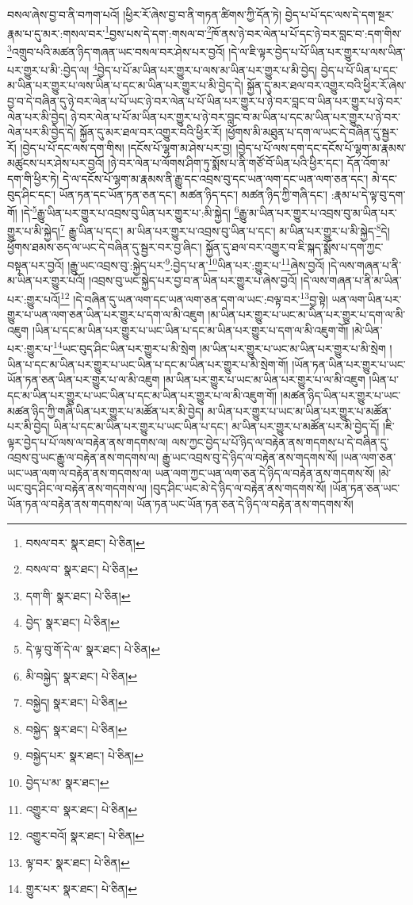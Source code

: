བསལ་ཞེས་བྱ་བ་ནི་བཀག་པའོ། །ཕྱིར་རོ་ཞེས་བྱ་བ་ནི་གཏན་ཚིགས་ཀྱི་དོན་ཏེ། བྱེད་པ་པོ་དང་ལས་དེ་དག་སྔར་རྣམ་པ་དུ་མར་:གསལ་བར་\footnote{བསལ་བར་  སྣར་ཐང་།  པེ་ཅིན། }བྱས་པས་དེ་དག་:གསལ་བ་\footnote{བསལ་བ་  སྣར་ཐང་།  པེ་ཅིན། }ཁོ་ནས་ཉེ་བར་ལེན་པ་པོ་དང་ཉེ་བར་བླང་བ་:དག་གིས་\footnote{དག་གི་  སྣར་ཐང་།  པེ་ཅིན། }འགྲུབ་པའི་མཚན་ཉིད་གཞན་ཡང་བསལ་བར་ཤེས་པར་བྱའོ། །དེ་ལ་ཇི་ལྟར་བྱེད་པ་པོ་ཡིན་པར་གྱུར་པ་ལས་ཡིན་པར་གྱུར་པ་མི་:བྱེད་ལ། \footnote{བྱེད་  སྣར་ཐང་།  པེ་ཅིན། }བྱེད་པ་པོ་མ་ཡིན་པར་གྱུར་པ་ལས་མ་ཡིན་པར་གྱུར་པ་མི་བྱེད། བྱེད་པ་པོ་ཡིན་པ་དང་མ་ཡིན་པར་གྱུར་པ་ལས་ཡིན་པ་དང་མ་ཡིན་པར་གྱུར་པ་མི་བྱེད་དེ། སྐྱོན་དུ་མར་ཐལ་བར་འགྱུར་བའི་ཕྱིར་རོ་ཞེས་བྱ་བ་དེ་བཞིན་དུ་ཉེ་བར་ལེན་པ་པོ་ཡང་ཉེ་བར་ལེན་པ་པོ་ཡིན་པར་གྱུར་པ་ཉེ་བར་བླང་བ་ཡིན་པར་གྱུར་པ་ཉེ་བར་ལེན་པར་མི་བྱེད། ཉེ་བར་ལེན་པ་པོ་མ་ཡིན་པར་གྱུར་པ་ཉེ་བར་བླང་བ་མ་ཡིན་པ་དང་མ་ཡིན་པར་གྱུར་པ་ཉེ་བར་ལེན་པར་མི་བྱེད་དེ། སྐྱོན་དུ་མར་ཐལ་བར་འགྱུར་བའི་ཕྱིར་རོ། །ཕྱོགས་མི་མཐུན་པ་དག་ལ་ཡང་དེ་བཞིན་དུ་སྦྱར་རོ། །བྱེད་པ་པོ་དང་ལས་དག་གིས། །དངོས་པོ་ལྷག་མ་ཤེས་པར་བྱ། །བྱེད་པ་པོ་ལས་དག་དང་དངོས་པོ་ལྷག་མ་རྣམས་མཚུངས་པར་ཤེས་པར་བྱའོ། །ཉེ་བར་ལེན་པ་ལོགས་ཤིག་ཏུ་སྨོས་པ་ནི་གཙོ་བོ་ཡིན་པའི་ཕྱིར་དང་། དོན་འོག་མ་དག་གི་ཕྱིར་ཏེ། དེ་ལ་དངོས་པོ་ལྷག་མ་རྣམས་ནི་རྒྱུ་དང་འབྲས་བུ་དང་ཡན་ལག་དང་ཡན་ལག་ཅན་དང་། མེ་དང་བུད་ཤིང་དང་། ཡོན་ཏན་དང་ཡོན་ཏན་ཅན་དང་། མཚན་ཉིད་དང་། མཚན་ཉིད་ཀྱི་གཞི་དང་། :རྣམ་པ་དེ་ལྟ་བུ་དག་གོ། །དེ་\footnote{དེ་ལྟ་བུ་གོ་དེ་ལ་  སྣར་ཐང་།  པེ་ཅིན། }རྒྱུ་ཡིན་པར་གྱུར་པ་འབྲས་བུ་ཡིན་པར་གྱུར་པ་:མི་སྐྱེད། \footnote{མི་བསྐྱེད་  སྣར་ཐང་།  པེ་ཅིན། }རྒྱུ་མ་ཡིན་པར་གྱུར་པ་འབྲས་བུ་མ་ཡིན་པར་གྱུར་པ་མི་སྐྱེད།\footnote{བསྐྱེད།  སྣར་ཐང་།  པེ་ཅིན། } རྒྱུ་ཡིན་པ་དང་། མ་ཡིན་པར་གྱུར་པ་འབྲས་བུ་ཡིན་པ་དང་། མ་ཡིན་པར་གྱུར་པ་མི་སྐྱེད་\footnote{བསྐྱེད་  སྣར་ཐང་།  པེ་ཅིན། }དེ། ཕྱོགས་ཐམས་ཅད་ལ་ཡང་དེ་བཞིན་དུ་སྦྱར་བར་བྱ་ཞིང་། སྐྱོན་དུ་ཐལ་བར་འགྱུར་བ་ཇི་སྐད་སྨོས་པ་དག་ཀྱང་བསྟན་པར་བྱའོ། །རྒྱུ་ཡང་འབྲས་བུ་:སྐྱེད་པར་\footnote{བསྐྱེད་པར་  སྣར་ཐང་།  པེ་ཅིན། }:བྱེད་པ་ན་\footnote{བྱེད་པ་མ་  སྣར་ཐང་། }ཡིན་པར་:གྱུར་པ་\footnote{འགྱུར་བ་  སྣར་ཐང་།  པེ་ཅིན། }ཞེས་བྱའོ། །དེ་ལས་གཞན་པ་ནི་མ་ཡིན་པར་གྱུར་པའོ། །འབྲས་བུ་ཡང་སྐྱེད་པར་བྱ་བ་ན་ཡིན་པར་གྱུར་པ་ཞེས་བྱའོ། །དེ་ལས་གཞན་པ་ནི་མ་ཡིན་པར་:གྱུར་པའོ།\footnote{འགྱུར་བའོ།  སྣར་ཐང་།  པེ་ཅིན། } །དེ་བཞིན་དུ་ཡན་ལག་དང་ཡན་ལག་ཅན་དག་ལ་ཡང་:བལྟ་བར་\footnote{ལྟ་བར་  སྣར་ཐང་།  པེ་ཅིན། }བྱ་སྟེ། ཡན་ལག་ཡིན་པར་གྱུར་པ་ཡན་ལག་ཅན་ཡིན་པར་གྱུར་པ་དག་ལ་མི་འཇུག །མ་ཡིན་པར་གྱུར་པ་ཡང་མ་ཡིན་པར་གྱུར་པ་དག་ལ་མི་འཇུག །ཡིན་པ་དང་མ་ཡིན་པར་གྱུར་པ་ཡང་ཡིན་པ་དང་མ་ཡིན་པར་གྱུར་པ་དག་ལ་མི་འཇུག་གོ། །མེ་ཡིན་པར་:གྱུར་པ་\footnote{གྱུར་པར་  སྣར་ཐང་།  པེ་ཅིན། }ཡང་བུད་ཤིང་ཡིན་པར་གྱུར་པ་མི་སྲེག །མ་ཡིན་པར་གྱུར་པ་ཡང་མ་ཡིན་པར་གྱུར་པ་མི་སྲེག །ཡིན་པ་དང་མ་ཡིན་པར་གྱུར་པ་ཡང་ཡིན་པ་དང་མ་ཡིན་པར་གྱུར་པ་མི་སྲེག་གོ། །ཡོན་ཏན་ཡིན་པར་གྱུར་པ་ཡང་ཡོན་ཏན་ཅན་ཡིན་པར་གྱུར་པ་ལ་མི་འཇུག །མ་ཡིན་པར་གྱུར་པ་ཡང་མ་ཡིན་པར་གྱུར་པ་ལ་མི་འཇུག །ཡིན་པ་དང་མ་ཡིན་པར་གྱུར་པ་ཡང་ཡིན་པ་དང་མ་ཡིན་པར་གྱུར་པ་ལ་མི་འཇུག་གོ། །མཚན་ཉིད་ཡིན་པར་གྱུར་པ་ཡང་མཚན་ཉིད་ཀྱི་གཞི་ཡིན་པར་གྱུར་པ་མཚོན་པར་མི་བྱེད། མ་ཡིན་པར་གྱུར་པ་ཡང་མ་ཡིན་པར་གྱུར་པ་མཚོན་པར་མི་བྱེད། ཡིན་པ་དང་མ་ཡིན་པར་གྱུར་པ་ཡང་ཡིན་པ་དང་། མ་ཡིན་པར་གྱུར་པ་མཚོན་པར་མི་བྱེད་དོ། །ཇི་ལྟར་བྱེད་པ་པོ་ལས་ལ་བརྟེན་ནས་གདགས་ལ། ལས་ཀྱང་བྱེད་པ་པོ་ཉིད་ལ་བརྟེན་ནས་གདགས་པ་དེ་བཞིན་དུ་འབྲས་བུ་ཡང་རྒྱུ་ལ་བརྟེན་ནས་གདགས་ལ། རྒྱུ་ཡང་འབྲས་བུ་དེ་ཉིད་ལ་བརྟེན་ནས་གདགས་སོ། །ཡན་ལག་ཅན་ཡང་ཡན་ལག་ལ་བརྟེན་ནས་གདགས་ལ། ཡན་ལག་ཀྱང་ཡན་ལག་ཅན་དེ་ཉིད་ལ་བརྟེན་ནས་གདགས་སོ། །མེ་ཡང་བུད་ཤིང་ལ་བརྟེན་ནས་གདགས་ལ། །བུད་ཤིང་ཡང་མེ་དེ་ཉིད་ལ་བརྟེན་ནས་གདགས་སོ། །ཡོན་ཏན་ཅན་ཡང་ཡོན་ཏན་ལ་བརྟེན་ནས་གདགས་ལ། ཡོན་ཏན་ཡང་ཡོན་ཏན་ཅན་དེ་ཉིད་ལ་བརྟེན་ནས་གདགས་སོ། 